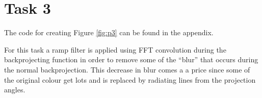 \section{Task 3}
The code for creating Figure \ref{fig:p3} can be found in the appendix.


For this task a ramp filter is applied using FFT convolution during the backprojecting function in
order to remove some of the ``blur'' that occurs during the normal backprojection. This decrease in
blur comes a a price since some of the original colour get lots and is replaced by radiating lines
from the projection angles.